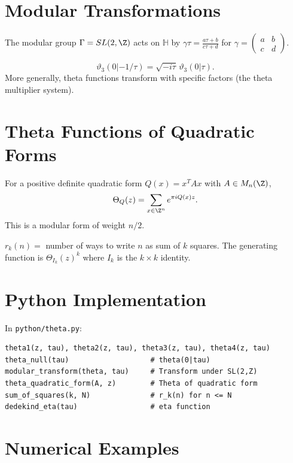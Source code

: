 \section{Modular Transformations}

The modular group $\Gamma = SL(2,\Z)$ acts on $\mathbb{H}$ by $\gamma \tau = \frac{a\tau + b}{c\tau + d}$ for $\gamma = \begin{pmatrix} a & b \\ c & d \end{pmatrix}$.

\begin{theorem}
\[
\vartheta_3(0|-1/\tau) = \sqrt{-i\tau}\, \vartheta_3(0|\tau).
\]
More generally, theta functions transform with specific factors (the theta multiplier system).
\end{theorem}

\section{Theta Functions of Quadratic Forms}

For a positive definite quadratic form $Q(x) = x^T A x$ with $A \in M_n(\Z)$,
\[
\Theta_Q(z) = \sum_{x \in \Z^n} e^{\pi i Q(x) z}.
\]
This is a modular form of weight $n/2$.

\begin{example}
$r_k(n) =$ number of ways to write $n$ as sum of $k$ squares.
The generating function is $\Theta_{I_k}(z)^k$ where $I_k$ is the $k\times k$ identity.
\end{example}

\section{Python Implementation}

In \texttt{python/theta.py}:

\begin{lstlisting}[style=python, caption={Key functions in python/theta.py}]
theta1(z, tau), theta2(z, tau), theta3(z, tau), theta4(z, tau)
theta_null(tau)                   # theta(0|tau)
modular_transform(theta, tau)     # Transform under SL(2,Z)
theta_quadratic_form(A, z)        # Theta of quadratic form
sum_of_squares(k, N)              # r_k(n) for n <= N
dedekind_eta(tau)                 # eta function
\end{lstlisting}

\section{Numerical Examples}

